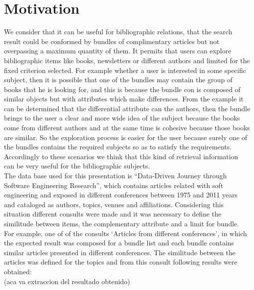 \section{Motivation}
We consider that it can be useful for bibliographic relations, that the search result could be conformed by bundles of complimentary articles but not overpassing a maximum quantity of them. It permits that users can explore bibliographic items like books, newsletters or different authors and limited for the fixed criterion selected. For example whether a user is interested in some specific subject, then it is possible that one of the bundles may contain the group of books that he is looking for, and this is because the bundle con is composed of similar objects but with attributes which make differences.
From the example it can be determined that the differential attribute can the authors, then the bundle brings to the user a clear and more wide idea of the subject because the books come from different authors and at the same time is cohesive because those books are similar. So the exploration process is easier for the user because surely one of the bundles contains the required subjects so as to satisfy the requirements. Accordingly to these scenarios we think that this kind of retrieval information can be very useful for the bibliographic subjects.\\
The data base used for this presentation is \textquotedblleft Data-Driven Journey through Software Engineering Research\textquotedblright, which contains articles related with soft engineering and exposed in different conferences between 1975 and 2011 years and cataloged as authors, topics, venues and affiliations. Considering this situation different consults were made and it was necessary to define the similitude between items, the complementary attribute and a limit for bundle.
For example, one of of the consults \textquoteleft Articles from different conferences\textquoteright, in which the expected result was composed for a bundle list and each bundle contains similar articles presented in different conferences. The similitude between the articles was defined for the topics and from this consult following results were obtained:\\
(aca va extraccion del resultado obtenido)